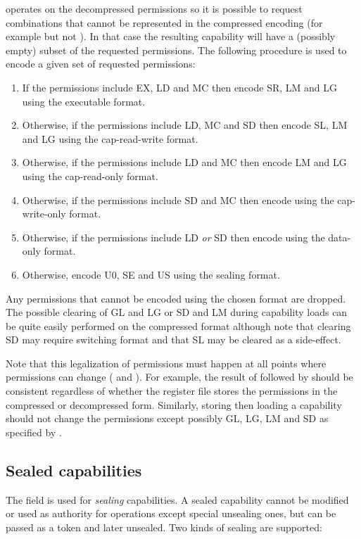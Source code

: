  operates on the decompressed permissions so it is possible to request combinations that cannot be represented in the compressed encoding (for example \cappermX but not \cappermL).
In that case the resulting capability will have a (possibly empty) subset of the requested permissions.
The following procedure is used to encode a given set of requested permissions:
\begin{enumerate}
\item If the permissions include EX, LD and MC then encode SR, LM and LG using the executable format.
\item Otherwise, if the permissions include LD, MC and SD then encode SL, LM and LG using the cap-read-write format.
\item Otherwise, if the permissions include LD and MC then encode LM and LG using the cap-read-only format.
\item Otherwise, if the permissions include SD and MC then encode using the cap-write-only format.
\item Otherwise, if the permissions include LD \emph{or} SD then encode using the data-only format.
\item Otherwise, encode U0, SE and US using the sealing format.
\end{enumerate}
Any permissions that cannot be encoded using the chosen format are dropped.
The possible clearing of GL and LG or SD and LM during capability loads can be quite easily performed on the compressed format although note that clearing SD may require switching format and that SL may be cleared as a side-effect.

Note that this legalization of permissions must happen at all points where permissions can change ( and ).
For example, the result of  followed by  should be consistent regardless of whether the register file stores the permissions in the compressed or decompressed form.
Similarly, storing then loading a capability should not change the permissions except possibly GL, LG, LM and SD as specified by .


\subsection{Sealed capabilities}
\label{sec:sealing}
The \cotype{} field is used for \emph{sealing} capabilities.
A sealed capability cannot be modified or used as authority for operations except special unsealing ones, but can be passed as a token and later unsealed.
Two kinds of sealing are supported:

